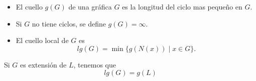 \documentclass[beamer]{standalone}
\begin{document}
\begin{standaloneframe}
  \begin{itemize}
  \item El \alert{cuello} $g(G)$ de una gráfica $G$ es la longitud del ciclo
    mas pequeño en $G$.\pause
  \item Si $G$ no tiene ciclos, se define $g(G)=\infty$.\pause
  \item El \alert{cuello local} de $G$ es
    \begin{equation*}
    lg(G)=\min\{g(N(x))\mid x\in G\}.      
    \end{equation*}
  \end{itemize}
  
  \pause\bigskip
  
  Si $G$ es extensión de $L$, tenemos que
  \begin{equation*}
    lg(G)=g(L)
  \end{equation*}
\end{standaloneframe}
\end{document}
